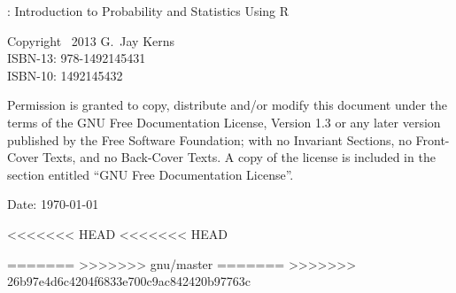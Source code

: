 %
%

\setcounter{page}{2}

\noindent \IPSUR: Introduction to Probability and Statistics Using \textsf{R}

\noindent Copyright \textcopyright~2013 G.~Jay Kerns \\ 
\noindent ISBN-13: 978-1492145431 \\ 
\noindent ISBN-10: 1492145432 \\ 
\medskip{}

\noindent Permission is granted to copy, distribute and/or modify this
document under the terms of the GNU Free Documentation License,
Version 1.3 or any later version published by the Free Software
Foundation; with no Invariant Sections, no Front-Cover Texts, and no
Back-Cover Texts. A copy of the license is included in the section
entitled ``GNU Free Documentation License''.

\vspace{0.25in}
\noindent Date: \today
\noindent \vfill{}

\cleardoublepage
{}
{}

\tableofcontents{}
<<<<<<< HEAD
<<<<<<< HEAD


=======
>>>>>>> gnu/master
=======
>>>>>>> 26b97e4d6c4204f6833e700c9ac842420b97763c
